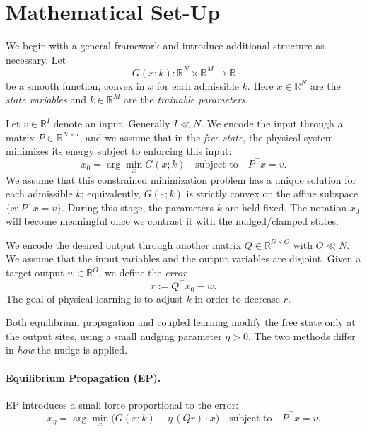 \documentclass[final, 11pt, nonatbib]{elsarticle}
\theoremstyle{definition}
\theoremstyle{plain}
\numberwithin{equation}{section}
\begin{document}
\section{Mathematical Set-Up}
\label{Mathematical Set up}

We begin with a general framework and introduce additional structure as necessary.
Let
\[
    G(x;k): \mathbb{R}^{N} \times \mathbb{R}^{M} \to \mathbb{R}
\]
be a smooth function, convex in $x$ for each admissible $k$. Here $x \in \mathbb{R}^N$ are the \textit{state variables} and $k \in \mathbb{R}^M$ are the \textit{trainable parameters}.

Let $v \in \mathbb{R}^I$ denote an input. Generally $I\ll N.$ We encode the input through a matrix $P \in \mathbb{R}^{N \times I}$, and we assume that in the \emph{free state}, the physical system minimizes its energy subject to enforcing this input:
\begin{equation}
    x_0
    = \arg\min_{x} G(x;k)
    \quad\text{subject to} \quad
    P^\top x = v.
    \label{eq:free-state}
\end{equation}
We assume that this constrained minimization problem has a unique solution for each admissible $k$; equivalently, $G(\cdot\,;k)$ is strictly convex on the affine subspace $\{x : P^\top x = v\}$.
During this stage, the parameters $k$ are held fixed.
The notation $x_0$ will become meaningful once we contrast it with the nudged/clamped states.

We encode the desired output through another matrix $Q \in \mathbb{R}^{N \times O}$ with $O \ll N$. We assume that the input variables and the output variables are disjoint. Given a target output $w \in \mathbb{R}^O$, we define the \emph{error}
\[
    r := Q^\top x_0 - w.
\]
The goal of physical learning is to adjust $k$ in order to decrease $r$.

Both equilibrium propagation and coupled learning modify the free state only at the output sites, using a small nudging parameter $\eta > 0$. The two methods differ in \emph{how} the nudge is applied.

\paragraph{Equilibrium Propagation (EP).}
EP introduces a small force proportional to the error:
\begin{equation}
    x_\eta 
    = \arg\min_{x} 
    \big(
        G(x;k) - \eta\, (Qr)\cdot x
    \big)
    \quad\text{subject to}\quad
    P^\top x = v.
    \label{eq:EP}
\end{equation}
\end{document}
